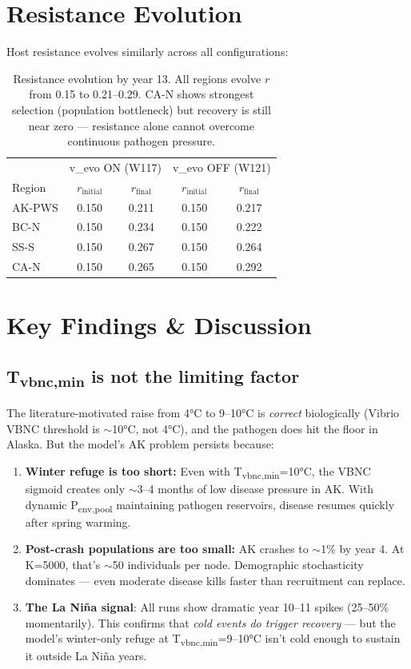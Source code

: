 \documentclass[11pt]{article}
\begin{document}
\section{Resistance Evolution}

Host resistance evolves similarly across all configurations:

\begin{table}[H]
\centering
\begin{tabular}{l|cc|cc}
\toprule
& \multicolumn{2}{c|}{v\_evo ON (W117)} & \multicolumn{2}{c}{v\_evo OFF (W121)} \\
Region & $r_\text{initial}$ & $r_\text{final}$ & $r_\text{initial}$ & $r_\text{final}$ \\
\midrule
AK-PWS & 0.150 & 0.211 & 0.150 & 0.217 \\
BC-N & 0.150 & 0.234 & 0.150 & 0.222 \\
SS-S & 0.150 & 0.267 & 0.150 & 0.264 \\
CA-N & 0.150 & 0.265 & 0.150 & 0.292 \\
\bottomrule
\end{tabular}
\caption{Resistance evolution by year 13. All regions evolve $r$ from 0.15 to 0.21--0.29. CA-N shows strongest selection (population bottleneck) but recovery is still near zero --- resistance alone cannot overcome continuous pathogen pressure.}
\end{table}

\section{Key Findings \& Discussion}

\subsection{T\textsubscript{vbnc,min} is not the limiting factor}

The literature-motivated raise from 4°C to 9--10°C is \textit{correct} biologically (Vibrio VBNC threshold is $\sim$10°C, not 4°C), and the pathogen does hit the floor in Alaska. But the model's AK problem persists because:

\begin{enumerate}
    \item \textbf{Winter refuge is too short:} Even with T\textsubscript{vbnc,min}=10°C, the VBNC sigmoid creates only $\sim$3--4 months of low disease pressure in AK. With dynamic P\textsubscript{env,pool} maintaining pathogen reservoirs, disease resumes quickly after spring warming.
    \item \textbf{Post-crash populations are too small:} AK crashes to $\sim$1\% by year 4. At K=5000, that's $\sim$50 individuals per node. Demographic stochasticity dominates --- even moderate disease kills faster than recruitment can replace.
    \item \textbf{The La Niña signal}: All runs show dramatic year 10--11 spikes (25--50\% momentarily). This confirms that \textit{cold events do trigger recovery} --- but the model's winter-only refuge at T\textsubscript{vbnc,min}=9--10°C isn't cold enough to sustain it outside La Niña years.
\end{enumerate}
\end{document}
